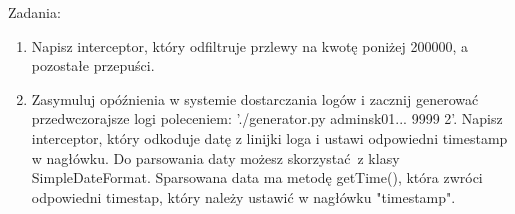 \documentclass{article}
\begin{document}
\pagebreak

Zadania:
\begin{enumerate}
\item Napisz interceptor, który odfiltruje przlewy na kwotę poniżej 200000, a pozostałe przepuści.
\item Zasymuluj opóźnienia w systemie dostarczania logów i zacznij generować przedwczorajsze logi poleceniem: './generator.py adminsk01... 9999 2'. Napisz interceptor, który odkoduje datę z linijki loga i ustawi odpowiedni timestamp w nagłówku. Do parsowania daty możesz skorzystać z klasy SimpleDateFormat. Sparsowana data ma metodę getTime(), która zwróci odpowiedni timestap, który należy ustawić w nagłówku "timestamp".
\end{enumerate}
\end{document}
